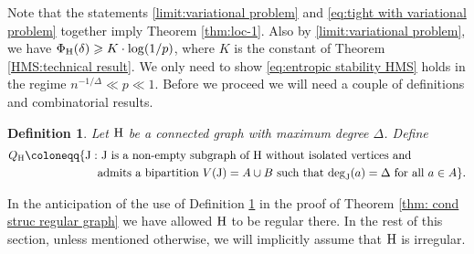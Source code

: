 \documentclass[a4paper,11pt,english,reqno]{amsart}
\numberwithin{equation}{section}
\renewcommand{\geq}{\geqslant}
\newcommand{\I}{\mathcal{I}}
\newcommand{\uH}{\textup{H}}
\newcommand{\tu}[1]{\textup{#1}}
\newtheorem{definition}[theorem]{Definition}
\begin{document}
		
		Note that the statements \eqref{limit:variational problem} and \eqref{eq:tight with variational problem} together imply Theorem \ref{thm:loc-1}. Also by \eqref{limit:variational problem}, we have $\Phi_{\uH}(\delta)\geq K\cdot \log(1/p)$, where $K$ is the constant of Theorem \ref{HMS:technical result}. We only need to show \eqref{eq:entropic stability HMS} %
		holds in the regime $n^{-1/\Delta}\ll p\ll 1$. Before we proceed we will need a couple of definitions and combinatorial results. 
		\begin{definition}\label{def:Q_H}
			Let $\uH$ be a connected graph with maximum degree $\Delta$. Define %
			\begin{equation*}
				\begin{aligned}
					Q_{\uH} \coloneqq \{\tu{J}: &\textup{ $\tu{J}$ is a non-empty subgraph of $\uH$ without isolated vertices and } \\ &\textup{admits a bipartition $V(\tu{J})=A\cup B$ such that $\tu{deg}_{\tu{J}}(a) = \Delta$ for all $a\in A$} \}.
				\end{aligned}
			\end{equation*}
		\end{definition}
		In the anticipation of the use of Definition \ref{def:Q_H} in the proof of Theorem \ref{thm: cond struc regular graph} we have allowed $\tu{H}$ to be regular there. In the rest of this section, unless mentioned otherwise, we will implicitly assume that $\tu{H}$ is irregular.	
		
		
		
		
		
		
		
		
		
		
		
		
		
\end{document}
